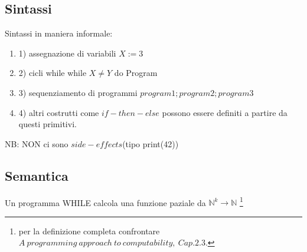\documentclass[a4paper, 12pt]{article}
\begin{document}
\subsection{Sintassi}
Sintassi in maniera informale:
\begin{enumerate}
\item 1) assegnazione di variabili $X:=3$
\item 2) cicli while   while $X \neq Y$ do Program
\item 3) sequenziamento di programmi  $program1; program2; program3$
\item 4) altri costrutti come $if-then-else$ possono essere definiti a partire da questi primitivi.
\end{enumerate} 
NB: NON ci sono $side-effects$(tipo print(42))
\subsection{Semantica}
Un programma WHILE calcola una funzione paziale da $\mathbb{N}^{k} \rightarrow \mathbb{N}$ \footnote{per la definizione completa confrontare $A\ programming\ approach\ to\ computability,\ Cap.2.3.$}
\end{document}
